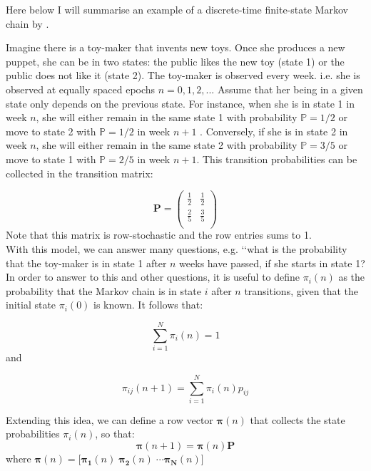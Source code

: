 \documentclass[\main/main.tex]{subfiles}
\begin{document}
Here below I will summarise an example of a discrete-time finite-state Markov chain by \cite{Howard1960}.\\

\begin{small}
Imagine there is a toy-maker that invents new toys. Once she produces a new puppet, she can be in two states: the public likes the new toy (state 1) or the public does not like it (state 2). The toy-maker is observed every week. i.e. she is observed at equally spaced epochs $n = 0, 1,2,..$.
Assume that her being in a given state only depends on the previous state. For instance, when she is in state 1 in week $n$, she will either remain in the same state 1 with probability $\mathds{P} = 1/2$ or move to state 2 with $\mathds{P} = 1/2$ in week $n+1$  . Conversely, if she is in state 2 in week $n$, she will either remain in the same state 2 with probability $\mathds{P} = 3/5$ or move to state 1 with $\mathds{P} = 2/5$ in week $n+1$. This transition probabilities can be collected in the transition matrix:


\begin{equation*}
\mathbf{P} =
\begin{pmatrix}
\frac{1}{2} &  \frac{1}{2}\\
\frac{2}{5} &  \frac{3}{5}\\
\end{pmatrix}
\end{equation*}
Note that this matrix is row-stochastic and the row entries sums to 1.\\

With this model, we can answer many questions, e.g. \lq\lq what is the probability that the toy-maker is in state 1 after $n$ weeks have passed, if she starts in state 1?\\

In order to answer to this and other questions, it is useful to define $\pi_i(n)$ as the probability that the Markov chain is in state $i$ after $n$ transitions, given that the initial state $\pi_i(0)$ is known. It follows that:

\begin{equation}
    \sum_{i=1}^{N} \pi_i(n) = 1
\end{equation}
and 

\begin{equation}
    \pi_{ij}(n+1) = \sum_{i=1}^{N}\pi_i(n) p_{ij}
\end{equation}

\noindent Extending this idea, we can define a row vector $\bm{\pi}(n)$ that collects the state probabilities $\pi_i(n)$, so that:
\begin{equation}
   \bm{\pi }(n+1)= \bm{\pi}(n) \mathbf{P}
\end{equation}
where $\bm{\pi}(n) = \lbrack \bm{\pi_1}(n) \; \bm{\pi_2}(n) \; \cdots \bm{\pi_N}(n) \rbrack$ 


\end{small}
\end{document}
